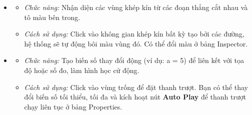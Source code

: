 \documentclass[12pt,a4paper]{article}
\begin{document}
\begin{itemize}[label=\textcolor{primary}{\faDraftingCompass}]
    \item {}
    \begin{itemize}
        \item \textit{Chức năng:} Nhận diện các vùng khép kín từ các đoạn thẳng cắt nhau và tô màu bên trong.
        \item \textit{Cách sử dụng:} Click vào không gian khép kín bất kỳ tạo bởi các đường, hệ thống sẽ tự động bôi màu vùng đó. Có thể đổi màu ở bảng Inspector.
    \end{itemize}
    
    \item {}
    \begin{itemize}
        \item \textit{Chức năng:} Tạo biến số thay đổi động (ví dụ: a = 5) để liên kết với tọa độ hoặc số đo, làm hình học cử động.
        \item \textit{Cách sử dụng:} Click vào vùng trống để đặt thanh trượt. Bạn có thể thay đổi biến số tối thiểu, tối đa và kích hoạt nút \textbf{Auto Play} để thanh trượt chạy liên tục ở bảng Properties.
    \end{itemize}
\end{itemize}
\end{document}

